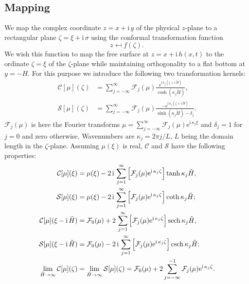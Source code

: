 \documentclass[a4paper,12pt]{article}
\newcommand{\mr}{\mathrm}
\newcommand{\mc}{\mathcal}
\newcommand{\ii}{\mr{i}\,}
\newcommand{\ee}{\mr{e}}
\renewcommand{\_}[1]{_\mr{#1}}
\let\Re\relax
\let\Im\relax
\DeclareMathOperator\Re{Re}
\DeclareMathOperator\Im{Im}
\newcommand{\z}{z}
\newcommand{\x}{x}
\newcommand{\y}{y}
\newcommand{\zz}{\zeta}
\newcommand{\xx}{\xi}
\newcommand{\yy}{\sigma}
\newcommand{\kk}{\kappa}
\newcommand{\zmap}{f}
\newcommand{\Hz}{H}
\newcommand{\Hzz}{\tilde H}
\newcommand{\hz}{h}
\newcommand{\Lsin}{\mc S}
\newcommand{\Lcos}{\mc C}
\newcommand{\FF}{\mc F}
\DeclareMathOperator{\sech}{sech}
\DeclareMathOperator{\csch}{csch}
\begin{document}
\subsection*{Mapping}
We map the complex coordinate
$\z = \x+\ii\y$
of the physical $\z$-plane to a rectangular plane $\zz=\xx+\ii\yy$ using the conformal transformation function
\[\z\mapsfrom \zmap(\zz).\]
We wish this function to map the free surface at $\z=\x+\ii\hz(\x,t)$ to the ordinate $\zz=\xx$ of the $\zz$-plane while maintaining orthogonality to a flat bottom at $\y=-\Hz$.
For this purpose we introduce the following two transformation kernels:
\newcommand{\fun}{\mu}
\begin{subequations}
\begin{align}
\Lcos[\fun](\zz) &= \sum_{j=-\infty}^\infty \FF_j(\fun) \frac{\ee^{\ii \kk_j(\zz+\ii \Hzz)}}{\cosh(\kk_j\Hzz)},%
\label{eq:Lcos}\\
\Lsin[\fun](\zz) &= \sum_{j=-\infty}^\infty \FF_j(\fun) \frac{-\ee^{\ii \kk_j(\zz+\ii \Hzz)}}{\sinh(\kk_j\Hzz)-\delta_j}.%
\label{eq:Lsin}%
\end{align}%
\label{eq:L}%
\end{subequations}%
$\FF_j(\fun)$ is here the Fourier transforms $\fun=\sum_{j=-\infty}^\infty \FF_j(\fun)\ee^{\ii \kk_j \xx}$ and $\delta_j=1$ for $j=0$ and zero otherwise. 
Wavenumbers are $\kk_j=2\pi j/L$, $L$ being the domain length in the $\zeta$-plane.
Assuming $\fun(\xx)$ is real, $\Lcos$ and $\Lsin $ have the following properties:
\begin{subequations}
\begin{align}
\Lcos[\fun](\xx) &= \fun(\xx)  -2\,\ii \sum_{j=1}^\infty \Im\Big[\FF_j(\fun) \ee^{\ii \kk_j\zz}\Big]\tanh\kk_j\Hzz,\label{eq:LProps:C0}\\
\Lsin[\fun](\xx) &= \fun(\xx)  -2\,\ii \sum_{j=1}^\infty \Im\Big[\FF_j(\fun) \ee^{\ii \kk_j\zz}\Big]\coth\kk_j\Hzz;\label{eq:LProps:S0}\\
\Lcos[\fun](\xx-\ii\Hzz) &= \FF_0(\fun)  +2\,    \sum_{j=1}^\infty \Re\Big[\FF_j(\fun) \ee^{\ii \kk_j\zz}\Big]\sech\kk_j\Hzz,\label{eq:LProps:CH}\\
\Lsin[\fun](\xx-\ii\Hzz) &= \FF_0(\fun)  -2\,\ii \sum_{j=1}^\infty \Im\Big[\FF_j(\fun) \ee^{\ii \kk_j\zz}\Big]\csch\kk_j\Hzz;\label{eq:LProps:SH}\\
\lim_{\Hzz\to\infty}\Lcos[\fun](\zz) &=\lim_{\Hzz\to\infty}\Lsin[\fun](\zz)= \FF_0(\fun) + 2 \sum_{j=-\infty}^{-1} \FF_j(\fun) \ee^{\ii \kk_j \zz}.\label{eq:LProps:lim}
\end{align}%
\label{eq:LProps}%
\end{subequations}%
\end{document}
